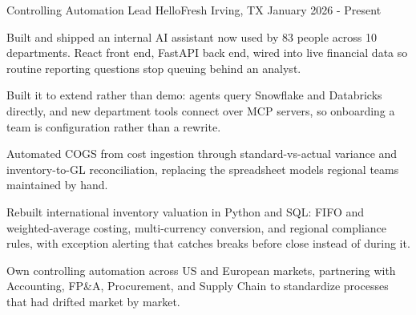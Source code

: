

\begin{cventries}

\cventry
  {Controlling Automation Lead} %
  {HelloFresh} %
  {Irving, TX} %
  {January 2026 - Present} %
  {
    \begin{cvitems} %
      \item {Built and shipped an internal AI assistant now used by 83 people across 10 departments. React front end, FastAPI back end, wired into live financial data so routine reporting questions stop queuing behind an analyst.}
      \item {Built it to extend rather than demo: agents query Snowflake and Databricks directly, and new department tools connect over MCP servers, so onboarding a team is configuration rather than a rewrite.}
      \item {Automated COGS from cost ingestion through standard-vs-actual variance and inventory-to-GL reconciliation, replacing the spreadsheet models regional teams maintained by hand.}
      \item {Rebuilt international inventory valuation in Python and SQL: FIFO and weighted-average costing, multi-currency conversion, and regional compliance rules, with exception alerting that catches breaks before close instead of during it.}
      \item {Own controlling automation across US and European markets, partnering with Accounting, FP\&A, Procurement, and Supply Chain to standardize processes that had drifted market by market.}
    \end{cvitems}
  }
  

\end{cventries}
